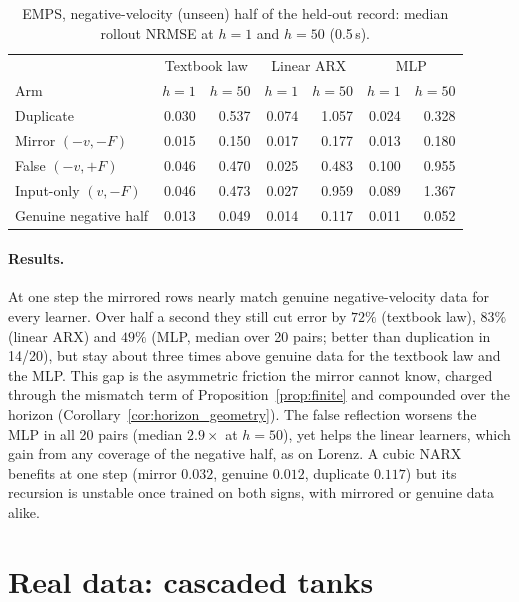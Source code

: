 \begin{table}[h]
\centering\small
\caption{EMPS, negative-velocity (unseen) half of the held-out record: median rollout NRMSE at $h=1$ and $h=50$ (0.5\,s).}
\label{tab:emps}
\setlength{\tabcolsep}{4pt}
\begin{tabular}{lrrrrrr}
\toprule
 & \multicolumn{2}{c}{Textbook law} & \multicolumn{2}{c}{Linear ARX} & \multicolumn{2}{c}{MLP}\\
Arm & $h{=}1$ & $h{=}50$ & $h{=}1$ & $h{=}50$ & $h{=}1$ & $h{=}50$\\
\midrule
Duplicate & 0.030 & 0.537 & 0.074 & 1.057 & 0.024 & 0.328\\
Mirror $(-v,-F)$ & 0.015 & 0.150 & 0.017 & 0.177 & 0.013 & 0.180\\
False $(-v,+F)$ & 0.046 & 0.470 & 0.025 & 0.483 & 0.100 & 0.955\\
Input-only $(v,-F)$ & 0.046 & 0.473 & 0.027 & 0.959 & 0.089 & 1.367\\
Genuine negative half & 0.013 & 0.049 & 0.014 & 0.117 & 0.011 & 0.052\\
\bottomrule
\end{tabular}
\end{table}

\paragraph{Results.} At one step the mirrored rows nearly match genuine negative-velocity data for every learner. Over half a second they still cut error by $72\%$ (textbook law), $83\%$ (linear ARX) and $49\%$ (MLP, median over 20 pairs; better than duplication in 14/20), but stay about three times above genuine data for the textbook law and the MLP. This gap is the asymmetric friction the mirror cannot know, charged through the mismatch term of Proposition~\ref{prop:finite} and compounded over the horizon (Corollary~\ref{cor:horizon_geometry}). The false reflection worsens the MLP in all 20 pairs (median $2.9\times$ at $h=50$), yet helps the linear learners, which gain from any coverage of the negative half, as on Lorenz. A cubic NARX benefits at one step (mirror $0.032$, genuine $0.012$, duplicate $0.117$) but its recursion is unstable once trained on both signs, with mirrored or genuine data alike.

\section{Real data: cascaded tanks}\label{app:tanks}
